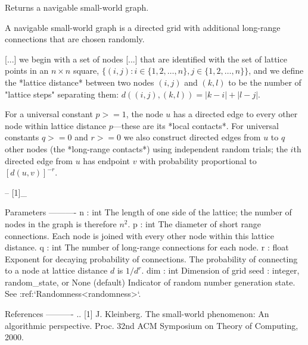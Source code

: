 \begin{DoxyVerb}Returns a navigable small-world graph.

A navigable small-world graph is a directed grid with additional long-range
connections that are chosen randomly.

  [...] we begin with a set of nodes [...] that are identified with the set
  of lattice points in an $n \times n$ square,
  $\{(i, j): i \in \{1, 2, \ldots, n\}, j \in \{1, 2, \ldots, n\}\}$,
  and we define the *lattice distance* between two nodes $(i, j)$ and
  $(k, l)$ to be the number of "lattice steps" separating them:
  $d((i, j), (k, l)) = |k - i| + |l - j|$.

  For a universal constant $p >= 1$, the node $u$ has a directed edge to
  every other node within lattice distance $p$---these are its *local
  contacts*. For universal constants $q >= 0$ and $r >= 0$ we also
  construct directed edges from $u$ to $q$ other nodes (the *long-range
  contacts*) using independent random trials; the $i$th directed edge from
  $u$ has endpoint $v$ with probability proportional to $[d(u,v)]^{-r}$.

  -- [1]_

Parameters
----------
n : int
    The length of one side of the lattice; the number of nodes in
    the graph is therefore $n^2$.
p : int
    The diameter of short range connections. Each node is joined with every
    other node within this lattice distance.
q : int
    The number of long-range connections for each node.
r : float
    Exponent for decaying probability of connections.  The probability of
    connecting to a node at lattice distance $d$ is $1/d^r$.
dim : int
    Dimension of grid
seed : integer, random_state, or None (default)
    Indicator of random number generation state.
    See :ref:`Randomness<randomness>`.

References
----------
.. [1] J. Kleinberg. The small-world phenomenon: An algorithmic
   perspective. Proc. 32nd ACM Symposium on Theory of Computing, 2000.
\end{DoxyVerb}
 \mbox{\label{namespacenetworkx_1_1generators_1_1geometric_aa0380de561153f3a41d8ea691df02370}} 
